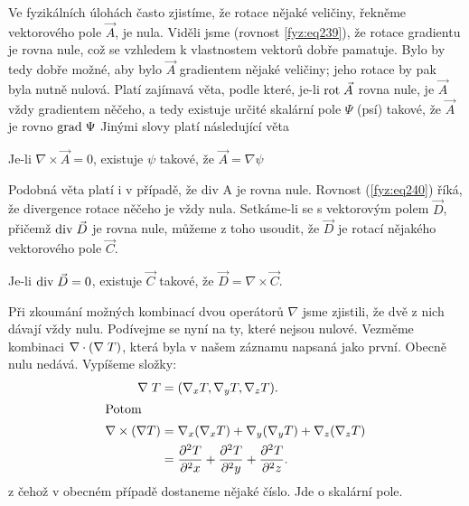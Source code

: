 {    Ve fyzikálních úlohách často zjistíme, že rotace nějaké veličiny, řekněme vektorového pole 
    \(\vec{A}\), je nula. Viděli jsme (rovnost \ref{fyz:eq239}), že rotace gradientu je rovna 
    nule, což se vzhledem k vlastnostem vektorů dobře pamatuje. Bylo by tedy dobře možné, aby bylo 
    \(\vec{A}\) gradientem nějaké veličiny; jeho rotace by pak byla nutně nulová. Platí zajímavá 
    věta, podle které, je-li \(\mathrm{rot}\;\vec{A}\) rovna nule, je \(\vec{A}\) vždy gradientem něčeho, a tedy 
    existuje určité skalární pole \(\Psi\) (psí) takové, že \(\vec{A}\) je rovno \(\mathrm{grad\;}\Psi\) 
    Jinými slovy platí následující věta
    \begin{lemma}
      Je-li $\nabla\times\vec{A}=0$, existuje $\psi$ takové, že $\vec{A} = \nabla\psi$
    \end{lemma}
    Podobná věta platí i v případě, že div A je rovna nule. Rovnost (\ref{fyz:eq240}) říká, že
    divergence rotace něčeho je vždy nula. Setkáme-li se s vektorovým polem \(\vec{D}\), přičemž 
    \(\mathrm{div}\;\vec{D}\) je rovna nule, můžeme z toho usoudit, že \(\vec{D}\) je rotací nějakého vektorového pole 
    \(\vec{C}\).
    \begin{lemma}
      Je-li $\mathrm{div}\;\vec{D} = 0$, existuje $\vec{C}$ takové, že $\vec{D} = \nabla\times\vec{C}$.
    \end{lemma}
    Při zkoumání možných kombinací dvou operátorů \(\nabla\) jsme zjistili, že dvě z nich dávají 
    vždy nulu. Podívejme se nyní na ty, které nejsou nulové. Vezměme kombinaci 
    \(\nabla\cdot(\nabla\;T)\), která byla v našem záznamu napsaná jako první. Obecně nulu nedává. 
    Vypíšeme složky: 
    \begin{align*}
      \nabla\;T              &= (\nabla_xT, \nabla_yT, \nabla_zT).  \\
      \shortintertext{Potom}
      \nabla\times(\nabla T) &= \nabla_x(\nabla_xT) + \nabla_y(\nabla_yT) + \nabla_z(\nabla_zT)   \\
                             &= \frac{\partial^2 T}{\partial^2 x} + \frac{\partial^2 T}{\partial^2 y} + \frac{\partial^2 T}{\partial^2 z}.
    \end{align*}
    z čehož v obecném případě dostaneme nějaké číslo. Jde o skalární pole. 
  
}
